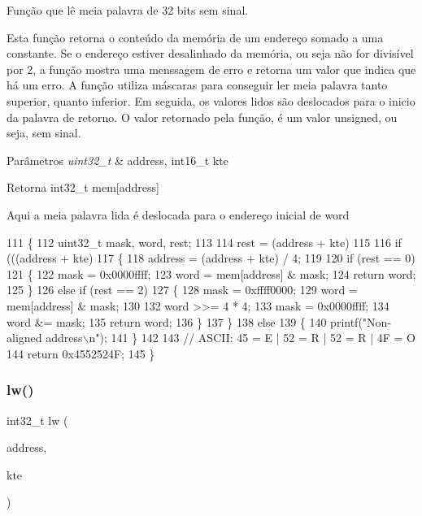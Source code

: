 Função que lê meia palavra de 32 bits sem sinal. 

Esta função retorna o conteúdo da memória de um endereço somado a uma constante. Se o endereço estiver desalinhado da memória, ou seja não for divisível por 2, a função mostra uma menssagem de erro e retorna um valor que indica que há um erro. A função utiliza máscaras para conseguir ler meia palavra tanto superior, quanto inferior. Em seguida, os valores lidos são deslocados para o inicio da palavra de retorno. O valor retornado pela função, é um valor unsigned, ou seja, sem sinal. 
\begin{DoxyParams}{Parâmetros}
{\em uint32\+\_\+t} & address, int16\+\_\+t kte \\
\hline
\end{DoxyParams}
\begin{DoxyReturn}{Retorna}
int32\+\_\+t mem[address] 
\end{DoxyReturn}
Aqui a meia palavra lida é deslocada para o endereço inicial de word 
\begin{DoxyCode}
111 \{
112     uint32\_t mask, word, rest;
113 
114     rest = (address + kte) %
115 
116     \textcolor{keywordflow}{if} (((address + kte) %
117     \{
118         address = (address + kte) / 4;
119 
120         \textcolor{keywordflow}{if} (rest == 0)
121         \{
122             mask = 0x0000ffff;
123             word = mem[address] & mask;
124             \textcolor{keywordflow}{return} word;
125         \}
126         \textcolor{keywordflow}{else} \textcolor{keywordflow}{if} (rest == 2)
127         \{
128             mask = 0xffff0000;
129             word = mem[address] & mask;
130 
132             word >>= 4 * 4;
133             mask = 0x0000ffff;
134             word &= mask;
135             \textcolor{keywordflow}{return} word;
136         \}
137     \}
138     \textcolor{keywordflow}{else}
139     \{
140         printf(\textcolor{stringliteral}{"Non-aligned address\(\backslash\)n"});
141     \}
142 
143     \textcolor{comment}{// ASCII: 45 = E | 52 = R | 52 = R | 4F = O}
144     \textcolor{keywordflow}{return} 0x4552524F;
145 \}
\end{DoxyCode}
\mbox{\label{memory_8h_ab7da1799afb42652e135e29ab57fc015}} 
\subsubsection{lw()}
{\footnotesize\ttfamily int32\+\_\+t lw (\begin{DoxyParamCaption}\item[{uint32\+\_\+t}]{address,  }\item[{int16\+\_\+t}]{kte }\end{DoxyParamCaption})}



